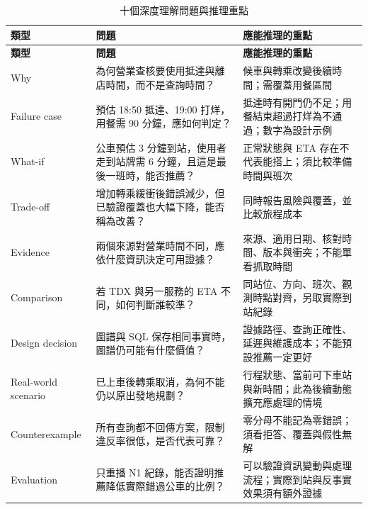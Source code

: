 {\small\singlespacing
\renewcommand{\arraystretch}{1.25}
\setlength{\tabcolsep}{3pt}
\begin{longtable}{|P{\arrayrulewidth\relax}|P{\arrayrulewidth\relax}|P{\arrayrulewidth\relax}|}
\caption{十個深度理解問題與推理重點}\label{table:deep_questions}\\
\hline
\textbf{類型} & \textbf{問題} & \textbf{應能推理的重點} \\ \hline
\endfirsthead
\hline
\textbf{類型} & \textbf{問題} & \textbf{應能推理的重點} \\ \hline
\endhead
Why & 為何營業查核要使用抵達與離店時間，而不是查詢時間？ & 候車與轉乘改變後續時間；需覆蓋用餐區間 \\ \hline
Failure case & 預估 18:50 抵達、19:00 打烊，用餐需 90 分鐘，應如何判定？ & 抵達時有開門仍不足；用餐結束超過打烊為不通過；數字為設計示例 \\ \hline
What-if & 公車預估 3 分鐘到站，使用者走到站牌需 6 分鐘，且這是最後一班時，能否推薦？ & 正常狀態與 ETA 存在不代表能搭上；須比較準備時間與班次 \\ \hline
Trade-off & 增加轉乘緩衝後錯誤減少，但已驗證覆蓋也大幅下降，能否稱為改善？ & 同時報告風險與覆蓋，並比較旅程成本 \\ \hline
Evidence & 兩個來源對營業時間不同，應依什麼資訊決定可用證據？ & 來源、適用日期、核對時間、版本與衝突；不能單看抓取時間 \\ \hline
Comparison & 若 TDX 與另一服務的 ETA 不同，如何判斷誰較準？ & 同站位、方向、班次、觀測時點對齊，另取實際到站紀錄 \\ \hline
Design decision & 圖譜與 SQL 保存相同事實時，圖譜仍可能有什麼價值？ & 證據路徑、查詢正確性、延遲與維護成本；不能預設推薦一定更好 \\ \hline
Real-world scenario & 已上車後轉乘取消，為何不能仍以原出發地規劃？ & 行程狀態、當前可下車站與新時間；此為後續動態擴充應處理的情境 \\ \hline
Counterexample & 所有查詢都不回傳方案，限制違反率很低，是否代表可靠？ & 零分母不能記為零錯誤；須看拒答、覆蓋與假性無解 \\ \hline
Evaluation & 只重播 N1 紀錄，能否證明推薦降低實際錯過公車的比例？ & 可以驗證資訊變動與處理流程；實際到站與反事實效果須有額外證據 \\ \hline
\end{longtable}
}
